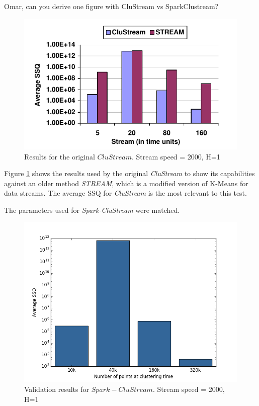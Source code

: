 \color{red}Omar, can you derive one figure with CluStream vs SparkClustream?\color{black}

\begin{figure}[h]
 \centering
 \includegraphics[scale=0.6]{./styles/2000h1-orig.png}
 \caption{Results for the original $CluStream$\cite{clustreamOrig}. Stream speed = 2000, H=1}
 \label{fig:2000orig}
\end{figure}

Figure \ref{fig:2000orig} shows the results used by the original \textit{CluStream} to show its capabilities against an older method \textit{STREAM}, which is a modified version of K-Means for data streams. The average SSQ for \textit{CluStream} is the most relevant to this test.

The parameters used for \textit{Spark-CluStream} were matched. 

\begin{figure}[h!]
 \centering
 \includegraphics[scale=0.5]{./styles/2000h1.png}
 \caption{Validation results for $Spark-CluStream$. Stream speed = 2000, H=1}
 \label{fig:2000}
\end{figure}

